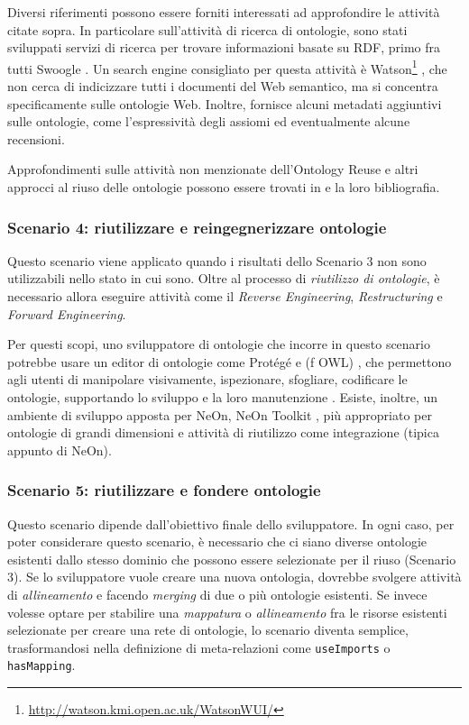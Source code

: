 \noindent Diversi riferimenti possono essere forniti interessati ad approfondire le attività citate sopra. In particolare sull'attività di ricerca di ontologie, sono stati sviluppati servizi di ricerca per trovare informazioni basate su RDF, primo fra tutti Swoogle \cite{swoogle}. Un search engine consigliato per questa attività è Watson\footnote{\url{http://watson.kmi.open.ac.uk/WatsonWUI/}} \cite{watson}, che non cerca di indicizzare tutti i documenti del Web semantico, ma si concentra specificamente sulle ontologie Web. Inoltre, fornisce alcuni metadati aggiuntivi sulle ontologie, come l'espressività degli assiomi ed eventualmente alcune recensioni.

Approfondimenti sulle attività non menzionate dell'Ontology Reuse e altri approcci al riuso delle ontologie possono essere trovati in \cite{carriero2020OntoReuse, caldarolaMultiStrategyApproach, ontologyEvaluation} e la loro bibliografia.
\subsubsection*{Scenario 4: riutilizzare e reingegnerizzare ontologie}
Questo scenario viene applicato quando i risultati dello Scenario 3 non sono utilizzabili nello stato in cui sono. Oltre al processo di \textit{riutilizzo di ontologie}, è necessario allora eseguire attività come il \textit{Reverse Engineering}, \textit{Restructuring} e \textit{Forward Engineering}. 

Per questi scopi, uno sviluppatore di ontologie che incorre in questo scenario potrebbe usare un editor di ontologie come Prot\'eg\'e \cite{protege} e (f OWL) \cite{fOWL}, che permettono agli utenti di manipolare visivamente, ispezionare, sfogliare, codificare le ontologie, supportando lo sviluppo e la loro manutenzione \cite{alatrish2012comparison}. Esiste, inoltre, un ambiente di sviluppo apposta per NeOn, NeOn Toolkit \cite{NeOnToolkit}, più appropriato per ontologie di grandi dimensioni e attività di riutilizzo come integrazione (tipica appunto di NeOn).

\subsubsection*{Scenario 5: riutilizzare e fondere ontologie}
Questo scenario dipende dall'obiettivo finale dello sviluppatore. In ogni caso, per poter considerare questo scenario, è necessario che ci siano diverse ontologie esistenti dallo stesso dominio che possono essere selezionate per il riuso (Scenario 3). Se lo sviluppatore vuole creare una nuova ontologia, dovrebbe svolgere attività di \textit{allineamento} e facendo \textit{merging} di due o più ontologie esistenti. Se invece volesse optare per stabilire una \textit{mappatura} o \textit{allineamento} fra le risorse esistenti selezionate per creare una rete di ontologie, lo scenario diventa semplice, trasformandosi nella definizione di meta-relazioni come \texttt{useImports} o \texttt{hasMapping}.


